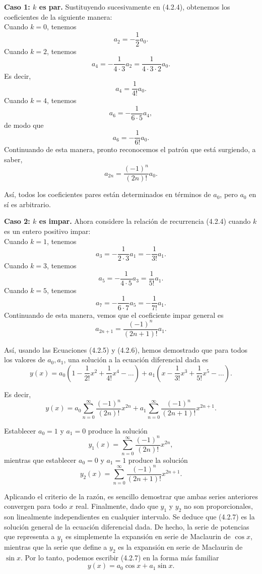 \begin{example}
\noindent \textbf{Caso 1: $k$ es par.} \quad Sustituyendo sucesivamente en (4.2.4), obtenemos los coeficientes de la siguiente manera:
\\
Cuando $k = 0$, tenemos
$$a_2 = -\frac{1}{2}a_0.$$
Cuando $k = 2$, tenemos
$$a_4 = -\frac{1}{4 \cdot 3}a_2 = \frac{1}{4 \cdot 3 \cdot 2}a_0.$$
Es decir,
$$a_4 = \frac{1}{4!}a_0.$$
Cuando $k = 4$, tenemos
$$a_6 = -\frac{1}{6 \cdot 5}a_4,$$
de modo que
$$a_6 = -\frac{1}{6!}a_0.$$
Continuando de esta manera, pronto reconocemos el patrón que está surgiendo, a saber,
\begin{equation} \tag{4.2.5}
\boxed{ a_{2n} = \frac{(-1)^n}{(2n)!}a_0. }
\end{equation}

Así, todos los coeficientes pares están determinados en términos de $a_0$, pero $a_0$ en sí es arbitrario.

\vspace{0.5cm}
\noindent \textbf{Caso 2: $k$ es impar.} \quad Ahora considere la relación de recurrencia (4.2.4) cuando $k$ es un entero positivo impar:
\\
Cuando $k = 1$, tenemos
$$a_3 = -\frac{1}{2 \cdot 3}a_1 = -\frac{1}{3!}a_1.$$
Cuando $k = 3$, tenemos
$$a_5 = -\frac{1}{4 \cdot 5}a_3 = \frac{1}{5!}a_1.$$
Cuando $k = 5$, tenemos
$$a_7 = -\frac{1}{6 \cdot 7}a_5 = -\frac{1}{7!}a_1.$$
Continuando de esta manera, vemos que el coeficiente impar general es
\begin{equation} \tag{4.2.6}
\boxed{ a_{2n+1} = \frac{(-1)^n}{(2n+1)!}a_1. }
\end{equation}

Así, usando las Ecuaciones (4.2.5) y (4.2.6), hemos demostrado que para todos los valores de $a_0, a_1$, una solución a la ecuación diferencial dada es
$$y(x) = a_0\left(1 - \frac{1}{2!}x^2 + \frac{1}{4!}x^4 - \dots\right) + a_1\left(x - \frac{1}{3!}x^3 + \frac{1}{5!}x^5 - \dots\right).$$

Es decir,
\begin{equation} \tag{4.2.7}
y(x) = a_0 \sum_{n=0}^{\infty} \frac{(-1)^n}{(2n)!}x^{2n} + a_1 \sum_{n=0}^{\infty} \frac{(-1)^n}{(2n+1)!}x^{2n+1}.
\end{equation}

Establecer $a_0 = 1$ y $a_1 = 0$ produce la solución
$$y_1(x) = \sum_{n=0}^{\infty} \frac{(-1)^n}{(2n)!}x^{2n},$$
mientras que establecer $a_0 = 0$ y $a_1 = 1$ produce la solución
$$y_2(x) = \sum_{n=0}^{\infty} \frac{(-1)^n}{(2n+1)!}x^{2n+1}.$$

Aplicando el criterio de la razón, es sencillo demostrar que ambas series anteriores convergen para todo $x$ real. Finalmente, dado que $y_1$ y $y_2$ no son proporcionales, son linealmente independientes en cualquier intervalo. Se deduce que (4.2.7) es la solución general de la ecuación diferencial dada. De hecho, la serie de potencias que representa a $y_1$ es simplemente la expansión en serie de Maclaurin de $\cos x$, mientras que la serie que define a $y_2$ es la expansión en serie de Maclaurin de $\sin x$. Por lo tanto, podemos escribir (4.2.7) en la forma más familiar
$$y(x) = a_0 \cos x + a_1 \sin x. $$

\end{example}

